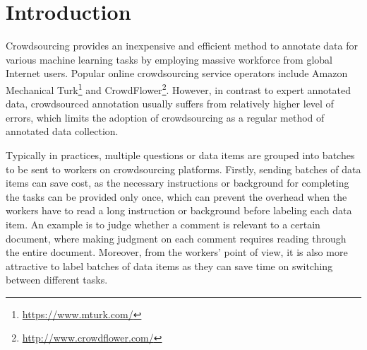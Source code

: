 \section{Introduction}
\label{sec:intro}

Crowdsourcing provides an inexpensive and efficient method to annotate data for various machine learning tasks 
by employing massive workforce from global Internet users.  
Popular online crowdsourcing service operators include 
Amazon Mechanical Turk\footnote{\url{https://www.mturk.com/}} and CrowdFlower\footnote{\url{http://www.crowdflower.com/}}.  
However, in contrast to expert annotated data, 
crowdsourced annotation usually suffers from relatively higher level of errors, 
which limits the adoption of crowdsourcing as a regular method of annotated data collection.


Typically in practices, multiple questions or data items are grouped into batches 
to be sent to workers on crowdsourcing platforms.  
Firstly, sending batches of data items can save cost, 
as the necessary instructions or background for completing the tasks can be provided only once, 
which can prevent the overhead when the workers have to read a long instruction or background before labeling each data item.  
An example is to judge whether a comment is relevant to a certain document, 
where making judgment on each comment requires reading through the entire document.  
Moreover, from the workers' point of view, 
it is also more attractive to label batches of data items 
as they can save time on switching between different tasks.  


